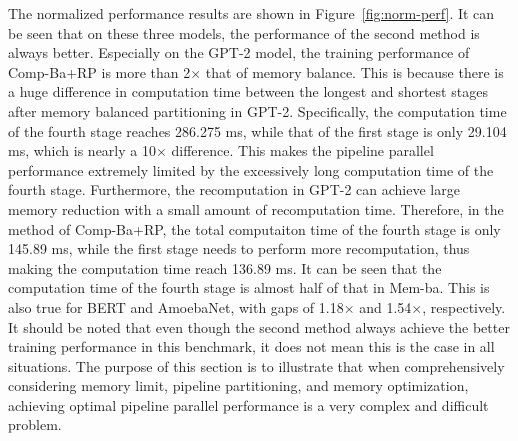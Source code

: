 
The normalized performance results are shown in Figure~\ref{fig:norm-perf}.
It can be seen that on these three models,
the performance of the second method is always better.
Especially on the GPT-2 model, the training performance of Comp-Ba+RP
is more than 2$\times$ that of memory balance.
This is because there is a huge difference in computation time between the longest and
shortest stages after memory balanced partitioning in GPT-2.
Specifically, the computation time of the fourth stage reaches 286.275 ms,
while that of the first stage is only 29.104 ms, which is nearly a 10$\times$ difference.
This makes the pipeline parallel performance extremely limited by the
excessively long computation time of the fourth stage.
Furthermore, the recomputation in GPT-2 can achieve
large memory reduction with a small amount of recomputation time.
Therefore, in the method of Comp-Ba+RP,
the total computaiton time of the fourth stage is only 145.89 ms,
while the first stage needs to perform more recomputation,
thus making the computation time reach 136.89 ms.
It can be seen that the computation time of the fourth stage
is almost half of that in Mem-ba.
This is also true for BERT and AmoebaNet,
with gaps of 1.18$\times$ and 1.54$\times$, respectively.
It should be noted that even though the second method
always achieve the better training performance in this benchmark,
it does not mean this is the case in all situations.
The purpose of this section is to illustrate that when comprehensively
considering memory limit, pipeline partitioning, and memory optimization,
achieving optimal pipeline parallel performance is a very complex and difficult problem.

